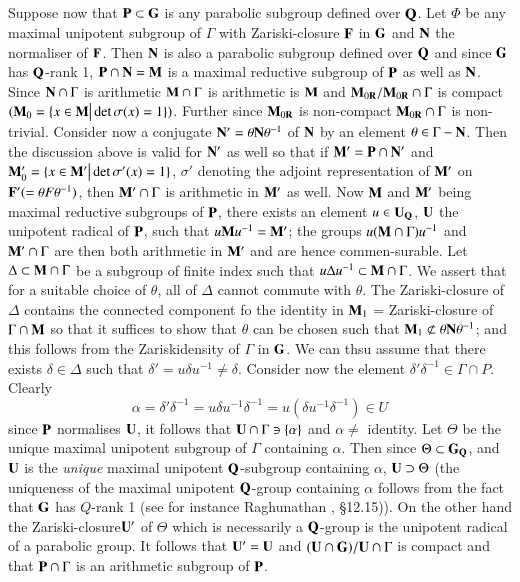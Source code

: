 \subsection{}\label{art9-subsec3.42}
Suppose now that $\mathbf{P} \subset \mathbf{G}$ is any parabolic subgroup defined over $\mathbf{Q}$. Let $\Phi$ be any maximal unipotent subgroup of $\Gamma$ with Zariski-closure $\mathbf{F}$ in $\mathbf{G}$ and $\mathbf{N}$ the normaliser of $\mathbf{F}$. Then $\mathbf{N}$ is also a parabolic subgroup defined over $\mathbf{Q}$ and since $\mathbf{G}$ has $\mathbf{Q}$-rank 1, $\mathbf{P} \cap\mathbf{N} = \mathbf{M}$ is a maximal reductive subgroup of $\mathbf{P}$ as well as $\mathbf{N}$. Since $\mathbf{N} \cap \Gamma$ is arithmetic $\mathbf{M} \cap \Gamma$ is arithmetic is $\mathbf{M}$ and $\mathbf{M}_{0\mathbf{R}}/ \mathbf{M}_{0\mathbf{R}} \cap \Gamma$ is compact $(\mathbf{M}_0 =\{x \in \mathbf{M} \big| \det \sigma (x) =1\})$. Further since $\mathbf{M}_{0\mathbf{R}}$ is non-compact $\mathbf{M}_{0\mathbf{R}} \cap \Gamma$ is non-trivial. Consider now a conjugate $\mathbf{N}' = \theta \mathbf{N} \theta^{-1}$ of $\mathbf{N}$ by an element $\theta \in \Gamma - \mathbf{N}$. Then the discussion above is valid for $\mathbf{N}'$ as well so that if $\mathbf{M}' = \mathbf{P} \cap \mathbf{N}'$ and $\mathbf{M}'_0 = \{x \in \mathbf{M}' \big| \det \sigma' (x) =1\}$, $\sigma'$ denoting the adjoint representation of $\mathbf{M}'$ on $\mathbf{F}' (= \theta F \theta^{-1})$, then $\mathbf{M}' \cap \Gamma$ is arithmetic in $\mathbf{M}'$ as well. Now $\mathbf{M}$ and $\mathbf{M}'$ being maximal reductive subgroups of $\mathbf{P}$, there exists an element $u \in \mathbf{U}_{\mathbf{Q}}$, $\mathbf{U}$ the unipotent radical of $\mathbf{P}$, such that $u \mathbf{M} u^{-1}= \mathbf{M}'$; the groups $u (\mathbf{M} \cap \Gamma) u^{-1}$ and $\mathbf{M}' \cap \Gamma$ are then both arithmetic in $\mathbf{M}'$ and are hence commen-surable. Let $\Delta \subset \mathbf{M} \cap \Gamma$ be a subgroup of finite index such that $u \Delta u^{-1} \subset \mathbf{M} \cap \Gamma$. We assert that for a suitable choice of $\theta$, all of $\Delta$ cannot commute with $\theta$. The Zariski-closure of $\Delta$ contains the connected component fo the identity in $\mathbf{M}_1$ = Zariski-closure of $\Gamma \cap \mathbf{M}$ so that it suffices to show that $\theta$ can be chosen such that $\mathbf{M}_1 \not\subset \theta \mathbf{N} \theta^{-1}$; and this follows from the Zariskidensity of $\Gamma$ in $\mathbf{G}$. We can thsu assume that there exists $\delta \in \Delta$ such that $\delta' = u \delta u^{-1} \neq \delta$. Consider now the element $\delta' \delta^{-1} \in \Gamma \cap P$. Clearly
$$
\alpha = \delta' \delta^{-1} = u \delta u^{-1} \delta^{-1} = u (\delta u^{-1} \delta^{-1}) \in U
$$
since $\mathbf{P}$ normalises $\mathbf{U}$, it follows that $\mathbf{U} \cap \Gamma \ni \{\alpha\}$ and $\alpha \neq$ identity. Let $\Theta$ be the unique maximal unipotent subgroup of $\Gamma$ containing $\alpha$. Then since $\Theta \subset \mathbf{G}_{\mathbf{Q}}$, and $\mathbf{U}$ is the \textit{unique} maximal unipotent $\mathbf{Q}$-subgroup containing $\alpha$, $\mathbf{U} \supset \Theta$ (the uniqueness of the maximal unipotent $\mathbf{Q}$-group containing $\alpha$ follows from the fact that $\mathbf{G}$ has $Q$-rank 1 (see for instance Raghunathan \cite{art9-raghunathan-1}, \S 12.15)). On the other hand the Zariski-closure\pageoriginale $\mathbf{U}'$ of $\Theta$ which is necessarily a $\mathbf{Q}$-group is the unipotent radical of a parabolic group. It follows that $\mathbf{U}' = \mathbf{U}$ and $(\mathbf{U} \cap \mathbf{G})/ \mathbf{U} \cap \Gamma$ is compact and that $\mathbf{P} \cap \Gamma$ is an arithmetic subgroup of $\mathbf{P}$.

